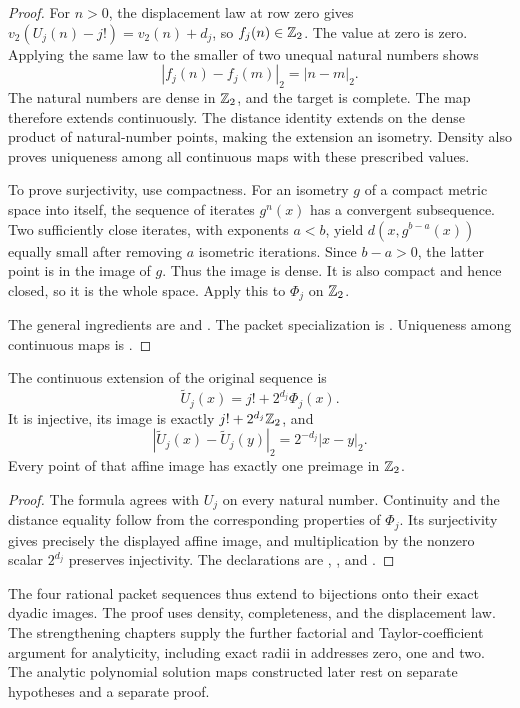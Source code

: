 \begin{proof}
For $n>0$, the displacement law at row zero gives
$v_2(U_j(n)-j!)=v_2(n)+d_j$, so $f_j(n)\in\mathbb Z_2$.
The value at zero is zero.  Applying the same law to the smaller of two
unequal natural numbers shows
\[
 |f_j(n)-f_j(m)|_2=|n-m|_2.
\]
The natural numbers are dense in $\mathbb Z_2$, and the target is complete.
The map therefore extends continuously.  The distance identity extends
on the dense product of natural-number points, making the extension
an isometry.  Density also proves uniqueness among all continuous maps
with these prescribed values.

To prove surjectivity, use compactness.  For an isometry $g$ of a compact
metric space into itself, the sequence of iterates $g^n(x)$ has a
convergent subsequence.  Two sufficiently close iterates, with exponents
$a<b$, yield $d(x,g^{b-a}(x))$ equally small after removing $a$ isometric
iterations.  Since $b-a>0$, the latter point is in the image of $g$.
Thus the image is dense.  It is also compact and hence closed, so it is
the whole space.  Apply this to $\Phi_j$ on $\mathbb Z_2$.

The general ingredients are
 and
.
The packet specialization is
.
Uniqueness among continuous maps is
.
\end{proof}

\begin{corollary}
\label{cor:arith-affine-image}
The continuous extension of the original sequence is
\[
 \widetilde U_j(x)=j!+2^{d_j}\Phi_j(x).
\]
It is injective, its image is exactly $j!+2^{d_j}\mathbb Z_2$, and
\[
 |\widetilde U_j(x)-\widetilde U_j(y)|_2
     =2^{-d_j}|x-y|_2.
\]
Every point of that affine image has exactly one preimage in $\mathbb Z_2$.
\end{corollary}

\begin{proof}
The formula agrees with $U_j$ on every natural number.  Continuity and
the distance equality follow from the corresponding properties of
$\Phi_j$.  Its surjectivity gives precisely the displayed affine image,
and multiplication by the nonzero scalar $2^{d_j}$ preserves injectivity.
The declarations are
,
, and
.
\end{proof}

The four rational packet sequences thus extend to bijections onto their
exact dyadic images.  The proof uses density, completeness, and the
displacement law. The strengthening chapters supply the further factorial and Taylor-coefficient argument for analyticity, including exact radii in addresses zero, one and two.  The analytic polynomial solution maps constructed
later rest on separate hypotheses and a separate proof.
